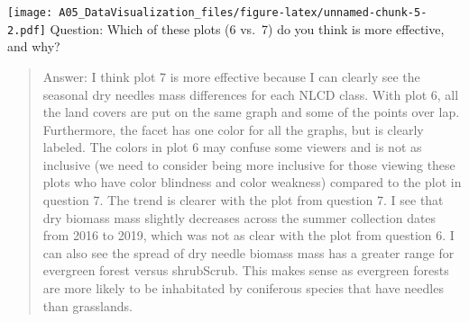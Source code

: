 \documentclass[
]{article}
\begin{document}
\texttt{[image: A05\_DataVisualization\_files/figure-latex/unnamed-chunk-5-2.pdf]}
Question: Which of these plots (6 vs.~7) do you think is more effective,
and why?

\begin{quote}
Answer: I think plot 7 is more effective because I can clearly see the
seasonal dry needles mass differences for each NLCD class. With plot 6,
all the land covers are put on the same graph and some of the points
over lap. Furthermore, the facet has one color for all the graphs, but
is clearly labeled. The colors in plot 6 may confuse some viewers and is
not as inclusive (we need to consider being more inclusive for those
viewing these plots who have color blindness and color weakness)
compared to the plot in question 7. The trend is clearer with the plot
from question 7. I see that dry biomass mass slightly decreases across
the summer collection dates from 2016 to 2019, which was not as clear
with the plot from question 6. I can also see the spread of dry needle
biomass mass has a greater range for evergreen forest versus shrubScrub.
This makes sense as evergreen forests are more likely to be inhabitated
by coniferous species that have needles than grasslands.
\end{quote}
\end{document}
